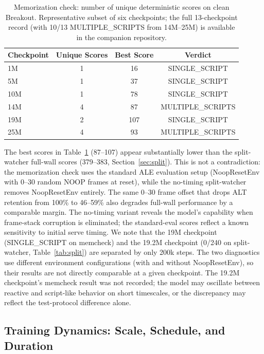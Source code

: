 \documentclass[11pt]{article}
\begin{document}
\begin{table}[ht]
\centering
\begin{tabular}{lccc}
\toprule
\textbf{Checkpoint} & \textbf{Unique Scores} & \textbf{Best Score} &
\textbf{Verdict} \\
\midrule
1M  & 1 & 16  & SINGLE\_SCRIPT \\
5M  & 1 & 37  & SINGLE\_SCRIPT \\
10M & 1 & 78  & SINGLE\_SCRIPT \\
14M & 4 & 87  & MULTIPLE\_SCRIPTS \\
19M & 2 & 107 & SINGLE\_SCRIPT \\
25M & 4 & 93  & MULTIPLE\_SCRIPTS \\
\bottomrule
\end{tabular}
\caption{Memorization check: number of unique deterministic scores on clean
Breakout. Representative subset of six checkpoints; the full 13-checkpoint
record (with 10/13 MULTIPLE\_SCRIPTS from 14M--25M) is available in the
companion repository.}
\label{tab:memcheck}
\end{table}

The best scores in Table~\ref{tab:memcheck} (87--107) appear substantially lower
than the split-watcher full-wall scores (379--383, Section~\ref{sec:split}). This
is not a contradiction: the memorization check uses the standard ALE evaluation
setup (NoopResetEnv with 0--30 random NOOP frames at reset), while the no-timing
split-watcher removes NoopResetEnv entirely. The same 0--30 frame offset that
drops ALT retention from 100\% to 46--59\% also degrades full-wall performance
by a comparable margin. The no-timing variant reveals the model's capability
when frame-stack corruption is eliminated; the standard-eval scores reflect a
known sensitivity to initial serve timing. We note that the 19M checkpoint
(SINGLE\_SCRIPT on memcheck) and the 19.2M checkpoint (0/240 on split-watcher,
Table~\ref{tab:split}) are separated by only 200k steps. The two diagnostics
use different environment configurations (with and without NoopResetEnv), so
their results are not directly comparable at a given checkpoint. The 19.2M
checkpoint's memcheck result was not recorded; the model may oscillate between
reactive and script-like behavior on short timescales, or the discrepancy may
reflect the test-protocol difference alone.

\subsection{Training Dynamics: Scale, Schedule, and Duration}
\end{document}

